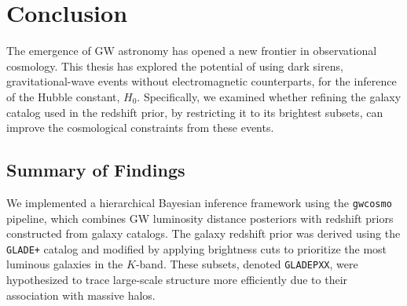 \chapter{Conclusion}
\label{chap:conclusion}

The emergence of \ac{GW} astronomy has opened a new frontier in observational cosmology. This thesis has explored the potential of using dark sirens, gravitational-wave events without electromagnetic counterparts, for the inference of the Hubble constant, $H_0$. Specifically, we examined whether refining the galaxy catalog used in the redshift prior, by restricting it to its brightest subsets, can improve the cosmological constraints from these events.

\section{Summary of Findings}

We implemented a hierarchical Bayesian inference framework using the \texttt{gwcosmo} pipeline, which combines \ac{GW} luminosity distance posteriors with redshift priors constructed from galaxy catalogs. The galaxy redshift prior was derived using the \texttt{GLADE+} catalog and modified by applying brightness cuts to prioritize the most luminous galaxies in the $K$-band. These subsets, denoted \texttt{GLADEPXX}, were hypothesized to trace large-scale structure more efficiently due to their association with massive halos.

